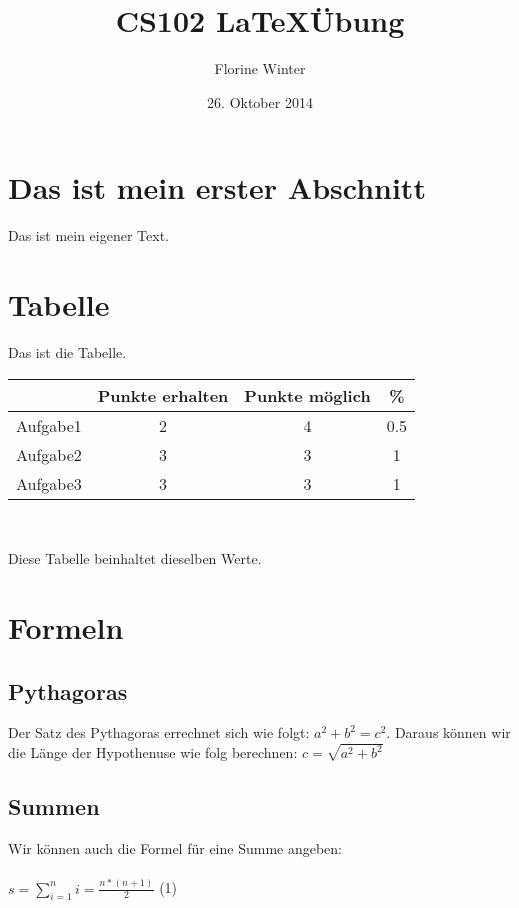 \documentclass{article}
\author{Florine Winter}
\title{CS102 \LaTeX \"Ubung}
\date{26. Oktober 2014}
\begin{document}
\maketitle
\section{Das ist mein erster Abschnitt}
Das ist mein eigener Text.
\section{Tabelle}
Das ist die Tabelle.\\

\begin{tabular}{c|c|c|c}

 & Punkte erhalten & Punkte m\"oglich & \% \\
\hline
Aufgabe1 & 2 & 4 & 0.5 \\
Aufgabe2 & 3 & 3 & 1 \\
Aufgabe3 & 3 & 3 & 1 \\

\end{tabular}\\
\begin{center}
Diese Tabelle beinhaltet dieselben Werte.
\end{center}

\section{Formeln}
\subsection{Pythagoras}
Der Satz des Pythagoras errechnet sich wie folgt:
$a^2 + b^2 = c^2$. Daraus k\"onnen wir die L\"ange der Hypothenuse wie folg berechnen: $c= \sqrt{a^2 + b^2}$
\subsection{Summen}
Wir k\"onnen auch die Formel f\"ur eine Summe angeben:\\
\\
\centering
$s= \sum\limits_{i=1}^{n}i=\frac{n*(n+1)}{2}$ (1)
\end{document}
